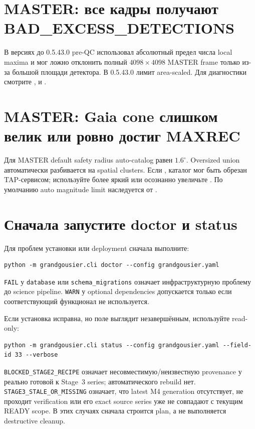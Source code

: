 \section{MASTER: все кадры получают BAD\_EXCESS\_DETECTIONS}

В версиях до 0.5.43.0 pre-QC использовал абсолютный предел числа local maxima и мог ложно отклонить полный $4098\times4098$ MASTER frame только из-за большой площади детектора. В 0.5.43.0 лимит area-scaled. Для диагностики смотрите ,  и .

\section{MASTER: Gaia cone слишком велик или ровно достиг MAXREC}

Для MASTER default safety radius auto-catalog равен $1.6^\circ$. Oversized union автоматически разбивается на spatial clusters. Если , каталог мог быть обрезан TAP-сервисом; используйте более яркий  или осознанно увеличьте . По умолчанию auto magnitude limit наследуется от .


\section{Сначала запустите doctor и status}

Для проблем установки или deployment сначала выполните:

\begin{lstlisting}
python -m grandgousier.cli doctor --config grandgousier.yaml
\end{lstlisting}

\texttt{FAIL} у \texttt{database} или \texttt{schema\_migrations} означает инфраструктурную проблему до science pipeline. \texttt{WARN} у optional dependencies допускается только если соответствующий функционал не используется.

Если установка исправна, но поле выглядит незавершённым, используйте read-only:

\begin{lstlisting}
python -m grandgousier.cli status --config grandgousier.yaml --field-id 33 --verbose
\end{lstlisting}

\texttt{BLOCKED\_STAGE2\_RECIPE} означает несовместимую/неизвестную provenance у реально готовой к Stage~3 series; автоматического rebuild нет. \texttt{STAGE3\_STALE\_OR\_MISSING} означает, что latest M4 generation отсутствует, не проходит verification или его exact source series уже не совпадают с текущим READY scope. В этих случаях сначала строится plan, а не выполняется destructive cleanup.



